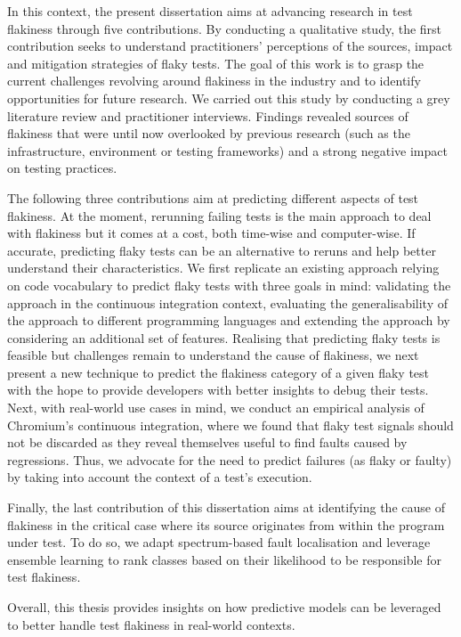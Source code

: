 In this context, the present dissertation aims at advancing research in test flakiness through five contributions. By conducting a qualitative study, the first contribution seeks to understand practitioners' perceptions of the sources, impact and mitigation strategies of flaky tests. The goal of this work is to grasp the current challenges revolving around flakiness in the industry and to identify opportunities for future research. We carried out this study by conducting a grey literature review and practitioner interviews. Findings revealed sources of flakiness that were until now overlooked by previous research (such as the infrastructure, environment or testing frameworks) and a strong negative impact on testing practices. 

The following three contributions aim at predicting different aspects of test flakiness. At the moment, rerunning failing tests is the main approach to deal with flakiness but it comes at a cost, both time-wise and computer-wise. If accurate, predicting flaky tests can be an alternative to reruns and help better understand their characteristics. We first replicate an existing approach relying on code vocabulary to predict flaky tests with three goals in mind: validating the approach in the continuous integration context, evaluating the generalisability of the approach to different programming languages and extending the approach by considering an additional set of features. Realising that predicting flaky tests is feasible but challenges remain to understand the cause of flakiness, we next present a new technique to predict the flakiness category of a given flaky test with the hope to provide developers with better insights to debug their tests. Next, with real-world use cases in mind, we conduct an empirical analysis of Chromium's continuous integration, where we found that flaky test signals should not be discarded as they reveal themselves useful to find faults caused  by regressions. Thus, we advocate for the need to predict failures (as flaky or faulty) by taking into account the context of a test's execution.

Finally, the last contribution of this dissertation aims at identifying the cause of flakiness in the critical case where its source originates from within the program under test. To do so, we adapt spectrum-based fault localisation and leverage ensemble learning to rank classes based on their likelihood to be responsible for test flakiness. 

Overall, this thesis provides insights on how predictive models can be leveraged to better handle test flakiness in real-world contexts.  